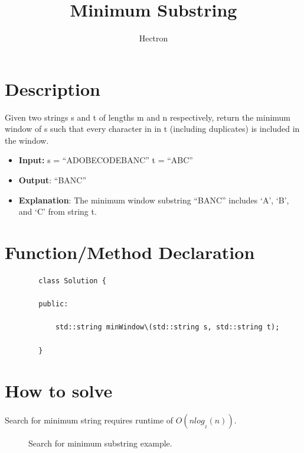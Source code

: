 \documentclass[a4paper,11pt]{article}
\author{Hectron}
\title{Minimum Substring}
\newcommand{\newpagex}{
    \newpage
    \vspace*{-7\baselineskip} %
}
\begin{document}
\maketitle

\tableofcontents

\newpagex
    \noindent

\section{Description}
    
    Given two strings s and t of lengths m and n respectively, return the minimum window of s such that every character in  in t (including duplicates) is included in the window.

    \begin{itemize}
    \item \textbf{Input:} \newline \textmd{s = ``ADOBECODEBANC''} \newline \textmd{t = ``ABC''}
    \item \textbf{Output}: \newline  \textmd{``BANC''}
    \item \textbf{Explanation}: \newline  \textmd{The minimum window substring ``BANC'' includes `A', `B', and `C' from string t.}
    \end{itemize}

\section{Function/Method Declaration}
    \footnotesize

    \begin{verbatim}
        class Solution {
        
        public:

            std::string minWindow\(std::string s, std::string t);

        }

    \end{verbatim}


\section{How to solve}
    

    \noindent
    Search for minimum string requires runtime of $O(nlog_{_2}(n))$.
    
    \begin{figure}[htbp]
        
        \noindent
    
        \caption{Search for minimum substring example.}

    \end{figure}
\end{document}
